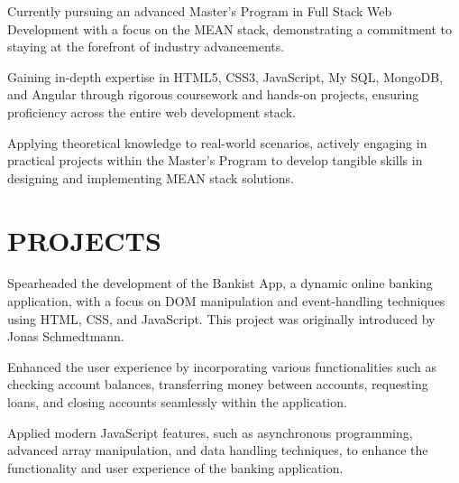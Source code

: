 \documentclass[]{deedy-resume-openfont}
\begin{document}
\begin{minipage}[t]{0.63\textwidth}
\begin{tightemize}
\item Currently pursuing an advanced Master’s Program in Full Stack Web Development with a focus on the MEAN stack,
demonstrating a commitment to staying at the forefront of industry advancements.
\vspace{2pt} %
\item Gaining in-depth expertise in HTML5, CSS3, JavaScript, My SQL, MongoDB, and Angular through rigorous coursework
and hands-on projects, ensuring proficiency across the entire web development stack.
\vspace{2pt} %
\item Applying theoretical knowledge to real-world scenarios, actively engaging in practical projects within the Master’s
Program to develop tangible skills in designing and implementing MEAN stack solutions.

\end{tightemize}
\sectionsep

\sectionsep



\section{PROJECTS}



\vspace{\topsep} %
\begin{tightemize}

\item Spearheaded the development of the Bankist App, a dynamic online banking application, with a focus on DOM
manipulation and event-handling techniques using HTML, CSS, and JavaScript. This project was originally introduced by
Jonas Schmedtmann.
\vspace{2pt} %
\item  Enhanced the user experience by incorporating various functionalities such as checking account balances, transferring
money between accounts, requesting loans, and closing accounts seamlessly within the application.
\vspace{2pt} %
\item  Applied modern JavaScript features, such as asynchronous programming, advanced array manipulation, and data
handling techniques, to enhance the functionality and user experience of the banking application.


\end{tightemize}
\sectionsep

\end{minipage}
\end{document}
